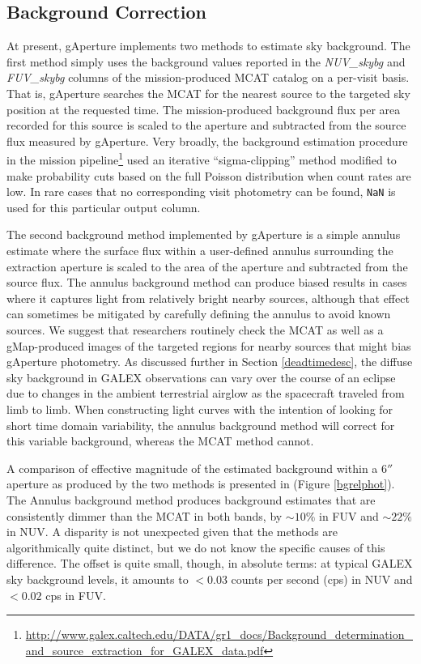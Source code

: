 \documentclass[preprint]{aastex}
\begin{document}
\subsection{Background Correction}
\label{bgcorr}
At present, gAperture implements two methods to estimate sky background. The first method simply uses the background values reported in the \emph{NUV\_skybg} and \emph{FUV\_skybg} columns of the mission-produced MCAT catalog on a per-visit basis. That is, gAperture searches the MCAT for the nearest source to the targeted sky position at the requested time. The mission-produced background flux per area recorded for this source is scaled to the aperture and subtracted from the source flux measured by gAperture. Very broadly, the background estimation procedure in the mission pipeline\footnote{\url{http://www.galex.caltech.edu/DATA/gr1_docs/Background_determination_and_source_extraction_for_GALEX_data.pdf}} used an iterative ``sigma-clipping'' method modified to make probability cuts based on the full Poisson distribution when count rates are low. In rare cases that no corresponding visit photometry can be found, \texttt{NaN} is used for this particular output column.

The second background method implemented by gAperture is a simple annulus estimate where the surface flux within a user-defined annulus surrounding the extraction aperture is scaled to the area of the aperture and subtracted from the source flux. The annulus background method can produce biased results in cases where it captures light from relatively bright nearby sources, although that effect can sometimes be mitigated by carefully defining the annulus to avoid known sources. We suggest that researchers routinely check the MCAT as well as a gMap-produced images of the targeted regions for nearby sources that might bias gAperture photometry. As discussed further in Section \ref{deadtimedesc}, the diffuse sky background in GALEX observations can vary over the course of an eclipse due to changes in the ambient terrestrial airglow as the spacecraft traveled from limb to limb. When constructing light curves with the intention of looking for short time domain variability, the annulus background method will correct for this variable background, whereas the MCAT method cannot.

A comparison of effective magnitude of the estimated background within a $6''$ aperture as produced by the two methods is presented in (Figure \ref{bgrelphot}). The Annulus background method produces background estimates that are consistently dimmer than the MCAT in both bands, by $\sim 10\%$ in FUV and $\sim 22\%$ in NUV. A disparity is not unexpected given that the methods are algorithmically quite distinct, but we do not know the specific causes of this difference. The offset is quite small, though, in absolute terms: at typical GALEX sky background levels, it amounts to $< 0.03$ counts per second (cps) in NUV and $< 0.02$ cps in FUV.
\end{document}
